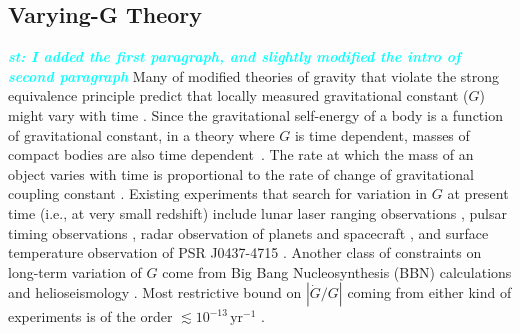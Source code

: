 \documentclass[prd,twocolumn,nofootinbib]{revtex4-1}
\newcommand{\st}[1]{\textcolor{cyan}{\it{\textbf{st: #1}}} }
\begin{document}
 \subsection{Varying-G Theory}\label{gdot}
 \st{I added the first paragraph, and slightly modified the intro of second paragraph}
Many of modified theories of gravity that violate the strong equivalence principle \cite{DiCasola:2013iia,Will2006,0264-9381-7-10-007} predict that locally measured gravitational constant ($G$) might vary with time \cite{uzan:2010pm}. Since the gravitational self-energy of a body is a function of gravitational constant, in a theory where $G$ is time dependent, masses of compact bodies are also time dependent~\cite{PhysRevLett.65.953}. The rate at which the mass of an object varies with time is proportional to the rate of change of gravitational coupling constant \cite{PhysRevLett.65.953}. Existing experiments that search for variation in $G$ at present time (i.e., at very small redshift) include lunar laser ranging observations \cite{Williams:2004qba}, pulsar timing observations  \cite{Deller:2008jx,Kaspi:1994hp}, radar observation of planets and spacecraft \cite{Pitjeva2005}, and surface temperature observation of PSR J0437-4715 \cite{Jofre:2006ug}. Another class of constraints on long-term variation of $G$ come from Big Bang Nucleosynthesis (BBN) calculations \cite{Bambi:2005fi,Copi:2003xd} and helioseismology \cite{0004-637X-498-2-871}. Most restrictive bound on $|\dot{G}/G|$ coming from either kind of experiments is of the order $\lesssim 10^{-13} \,\mathrm{yr}^{-1}$ \cite{Yunes:2009bv}.
\end{document}
